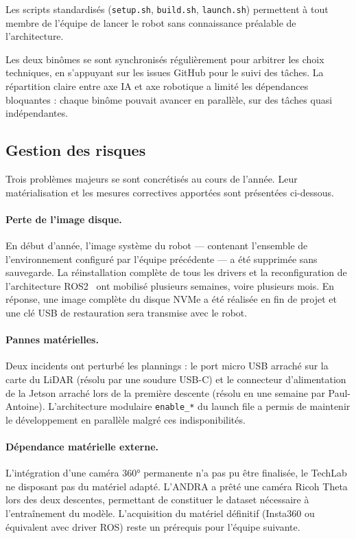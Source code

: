 \documentclass[12pt,a4paper]{article}
\begin{document}
Les scripts standardisés (\texttt{setup.sh}, \texttt{build.sh}, \texttt{launch.sh}) permettent à tout membre de l'équipe de lancer le robot sans connaissance préalable de l'architecture.

Les deux binômes se sont synchronisés régulièrement pour arbitrer les choix techniques, en s'appuyant sur les issues GitHub pour le suivi des tâches. La répartition claire entre axe IA et axe robotique a limité les dépendances bloquantes : chaque binôme pouvait avancer en parallèle, sur des tâches quasi indépendantes.

\subsection{Gestion des risques}

Trois problèmes majeurs se sont concrétisés au cours de l'année. Leur matérialisation et les mesures correctives apportées sont présentées ci-dessous.

\paragraph{Perte de l'image disque.}
En début d'année, l'image système du robot — contenant l'ensemble de l'environnement configuré par l'équipe précédente — a été supprimée sans sauvegarde. La réinstallation complète de tous les drivers et la reconfiguration de l'architecture ROS2~\cite{ros2} ont mobilisé plusieurs semaines, voire plusieurs mois. En réponse, une image complète du disque NVMe a été réalisée en fin de projet et une clé USB de restauration sera transmise avec le robot.

\paragraph{Pannes matérielles.}
Deux incidents ont perturbé les plannings : le port micro USB arraché sur la carte du LiDAR (résolu par une soudure USB-C) et le connecteur d'alimentation de la Jetson arraché lors de la première descente (résolu en une semaine par Paul-Antoine). L'architecture modulaire \texttt{enable\_*} du launch file a permis de maintenir le développement en parallèle malgré ces indisponibilités.

\paragraph{Dépendance matérielle externe.}
L'intégration d'une caméra 360° permanente n'a pas pu être finalisée, le TechLab ne disposant pas du matériel adapté. L'ANDRA a prêté une caméra Ricoh Theta lors des deux descentes, permettant de constituer le dataset nécessaire à l'entraînement du modèle. L'acquisition du matériel définitif (Insta360 ou équivalent avec driver ROS) reste un prérequis pour l'équipe suivante.
\end{document}

